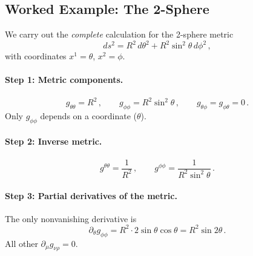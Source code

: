 \subsection{Worked Example: The 2-Sphere}
\label{sec:dg_cookbook_sphere}

We carry out the \emph{complete} calculation for the 2-sphere metric
\begin{equation}
    ds^2 = R^2\, d\theta^2 + R^2 \sin^2\theta\, d\phi^2 \,,
    \label{eq:cookbook_sphere_metric}
\end{equation}
with coordinates $x^1 = \theta$, $x^2 = \phi$.

\paragraph{Step 1: Metric components.}
\[
    g_{\theta\theta} = R^2 \,, \qquad
    g_{\phi\phi} = R^2 \sin^2\theta \,, \qquad
    g_{\theta\phi} = g_{\phi\theta} = 0 \,.
\]
Only $g_{\phi\phi}$ depends on a coordinate ($\theta$).

\paragraph{Step 2: Inverse metric.}
\[
    g^{\theta\theta} = \frac{1}{R^2} \,, \qquad
    g^{\phi\phi} = \frac{1}{R^2 \sin^2\theta} \,.
\]

\paragraph{Step 3: Partial derivatives of the metric.}
The only nonvanishing derivative is
\[
    \partial_\theta g_{\phi\phi}
    = R^2 \cdot 2\sin\theta\cos\theta
    = R^2 \sin 2\theta \,.
\]
All other $\partial_\mu g_{\nu\rho} = 0$.

